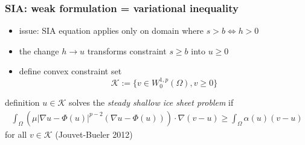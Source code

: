 \documentclass[hide notes,intlimits]{beamer}
\newcommand{\Kcal}{\mathcal{K}}
\begin{document}
\begin{frame}
  \frametitle{SIA: weak formulation = variational inequality} 

\begin{itemize}
\item issue: SIA equation applies only on domain where $s>b \iff h > 0$
\item the change $h \to u$ transforms  constraint $s \ge b$ into $u \ge 0$
\item define convex constraint set
  $$\Kcal := \{ v \in W^{1,p}_0 (\Omega), v \ge 0 \}$$
\end{itemize}

\begin{block}{definition} 
$u \in \Kcal$ solves the \emph{steady shallow ice sheet problem} if
\begin{align*}
\int_{\Omega}    \left( \mu  | \nabla u - \Phi(u) |^{p-2} 
( \nabla u - \Phi(u) )    \right)  \cdot \nabla ( v - u )  
\ge \int_{\Omega} \alpha(u) (  v -  u ) 
\end{align*}
for all $v \in \Kcal$ \hfill \scriptsize (Jouvet-Bueler 2012)
\end{block}
\end{frame}
\end{document}
